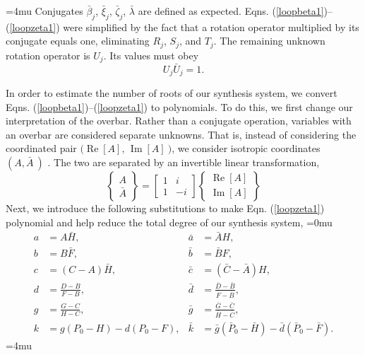 \documentclass[journal]{IEEEtran}
\def\*#1{\bar{#1}} %
\begin{document}
\medmuskip=4mu
Conjugates $\*\beta_j$, $\*\xi_j$, $\*\zeta_j$, $\*\lambda$ are defined as expected.  Eqns. (\ref{loopbeta1})--(\ref{loopzeta1}) were simplified by the fact that a rotation operator multiplied by its conjugate equals one, eliminating $R_j$, $S_j$, and $T_j$.  The remaining unknown rotation operator is $U_j$.  Its values must obey
\begin{equation}
U_j \*U_j = 1.
\label{Unorm}
\end{equation}



In order to estimate the number of roots of our synthesis system, we convert Eqns. (\ref{loopbeta1})--(\ref{loopzeta1}) to polynomials.
To do this, we first change our interpretation of the overbar.  Rather than a conjugate operation, variables with an overbar are considered separate unknowns.  
That is, instead of considering the coordinated pair $\big(\operatorname{Re}[A], \, \operatorname{Im}[A]\:\big)$, we consider isotropic coordinates $(A, \*A\:)$ \cite{wamplerIsotropicCoordinatesCircularity1996}.  The two are separated by an invertible linear transformation,
\begin{equation}
\begin{Bmatrix} A \\ \*A \end{Bmatrix} =
\begin{bmatrix} 1 & i \\ 1 & -i \end{bmatrix}
\begin{Bmatrix} \operatorname{Re}[A] \\ \operatorname{Im}[A] \end{Bmatrix}
\end{equation}
Next, we introduce the following substitutions to make Eqn. (\ref{loopzeta1}) polynomial and help reduce the total degree of our synthesis system,
\medmuskip=0mu
\begin{align}
a &= A\*H, & \*a &= \*AH, \label{sub1}\\
b &= B\*F, & \*b &= \*BF, \label{sub2}\\
c &= (C-A)\*H, & \*c &= (\*C-\*A)H, \label{sub3}\\
d &= \frac{D-B}{F-B}, & \*d &= \frac{\*D-\*B}{\*F-\*B}, \label{sub4}\\
g &= \frac{G-C}{H-C}, & \*g &= \frac{\*G-\*C}{\*H-\*C}, \label{sub5}\\
k &= g(P_0-H) - d(P_0-F), & \*k &= \*g(\*P_0-\*H) - \*d(\*P_0-\*F). \label{sub6}
\end{align}
\medmuskip=4mu
\end{document}

